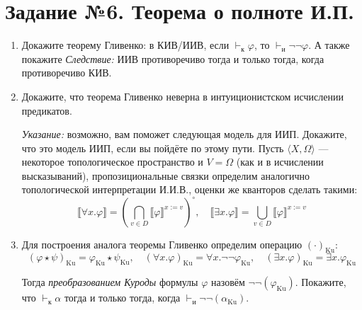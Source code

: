 \documentclass[10pt,a4paper,oneside]{article}
\begin{document}
\section*{Задание №6. Теорема о полноте И.П.}
\begin{enumerate}
\item Докажите теорему Гливенко: в КИВ/ИИВ, если $\vdash_\text{к} \varphi$, то $\vdash_\text{и} \neg\neg\varphi$. А также покажите
\emph{Следствие:} ИИВ противоречиво тогда и только тогда, когда противоречиво КИВ.
\item Докажите, что теорема Гливенко неверна в интуиционистском исчислении предикатов. 

\emph{Указание:} возможно, вам поможет следующая модель для ИИП. Докажите, что это модель ИИП, если вы пойдёте по этому пути.
Пусть $\langle X, \Omega\rangle$ --- некоторое топологическое
пространство и $V = \Omega$ (как и в исчислении высказываний),
пропозициональные связки определим аналогично топологической интерпретации И.И.В., 
оценки же кванторов сделать такими:
$$\llbracket \forall x.\varphi \rrbracket = \left(\bigcap_{v \in D} \llbracket \varphi \rrbracket^{x := v}\right)^\circ,\quad
  \llbracket \exists x.\varphi \rrbracket = \bigcup_{v \in D} \llbracket \varphi \rrbracket^{x := v}$$

\item Для построения аналога теоремы Гливенко определим операцию $(\cdot)_\text{Ku}$:
$$(\varphi\star\psi)_\text{Ku} = \varphi_\text{Ku} \star \psi_\text{Ku}, \quad 
(\forall x.\varphi)_\text{Ku} = \forall x.\neg\neg\varphi_\text{Ku}, \quad
(\exists x.\varphi)_\text{Ku} = \exists x.\varphi_\text{Ku}$$

Тогда \emph{преобразованием Куроды} формулы $\varphi$ назовём $\neg\neg(\varphi_\text{Ku})$. 
Покажите, что $\vdash_\text{к}\alpha$ тогда и только тогда, когда $\vdash_\text{и}\neg\neg(\alpha_\text{Ku})$.



\end{enumerate}
\end{document}
